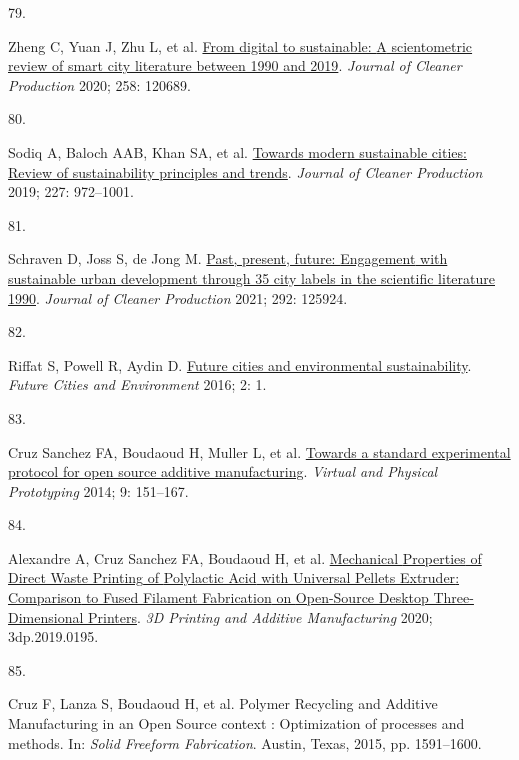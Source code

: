 \documentclass[
  12pt,
  a4paperpaper,
  onecolumn]{article}
\newlength{\cslhangindent}
\newlength{\csllabelwidth}
\newlength{\cslentryspacingunit} %
\newenvironment{CSLReferences}[2] %
 {%
  \setlength{\parindent}{0pt}
  \ifodd #1
  \let\oldpar\par
  \def\par{\hangindent=\cslhangindent\oldpar}
  \fi
  \setlength{\parskip}{#2\cslentryspacingunit}
 }%
 {}
\newcommand{\CSLLeftMargin}[1]{\parbox[t]{\csllabelwidth}{#1}}
\newcommand{\CSLRightInline}[1]{\parbox[t]{\linewidth - \csllabelwidth}{#1}\break}
\begin{document}
\begin{CSLReferences}{0}{0}
\leavevmode{}%
\CSLLeftMargin{79. }%
\CSLRightInline{Zheng C, Yuan J, Zhu L, et al.
\href{https://doi.org/10.1016/j.jclepro.2020.120689}{From digital to
sustainable: {A} scientometric review of smart city literature between
1990 and 2019}. \emph{Journal of Cleaner Production} 2020; 258: 120689.}

\leavevmode{}%
\CSLLeftMargin{80. }%
\CSLRightInline{Sodiq A, Baloch AAB, Khan SA, et al.
\href{https://doi.org/10.1016/j.jclepro.2019.04.106}{Towards modern
sustainable cities: {Review} of sustainability principles and trends}.
\emph{Journal of Cleaner Production} 2019; 227: 972--1001.}

\leavevmode{}%
\CSLLeftMargin{81. }%
\CSLRightInline{Schraven D, Joss S, de Jong M.
\href{https://doi.org/10.1016/j.jclepro.2021.125924}{Past, present,
future: {Engagement} with sustainable urban development through 35 city
labels in the scientific literature 1990\textendash 2019}. \emph{Journal
of Cleaner Production} 2021; 292: 125924.}

\leavevmode{}%
\CSLLeftMargin{82. }%
\CSLRightInline{Riffat S, Powell R, Aydin D.
\href{https://doi.org/10.1186/s40984-016-0014-2}{Future cities and
environmental sustainability}. \emph{Future Cities and Environment}
2016; 2: 1.}

\leavevmode{}%
\CSLLeftMargin{83. }%
\CSLRightInline{Cruz Sanchez FA, Boudaoud H, Muller L, et al.
\href{https://doi.org/10.1080/17452759.2014.919553}{Towards a standard
experimental protocol for open source additive manufacturing}.
\emph{Virtual and Physical Prototyping} 2014; 9: 151--167.}

\leavevmode{}%
\CSLLeftMargin{84. }%
\CSLRightInline{Alexandre A, Cruz Sanchez FA, Boudaoud H, et al.
\href{https://doi.org/10.1089/3dp.2019.0195}{Mechanical {Properties} of
{Direct Waste Printing} of {Polylactic Acid} with {Universal Pellets
Extruder}: {Comparison} to {Fused Filament Fabrication} on {Open-Source
Desktop Three-Dimensional Printers}}. \emph{3D Printing and Additive
Manufacturing} 2020; 3dp.2019.0195.}

\leavevmode{}%
\CSLLeftMargin{85. }%
\CSLRightInline{Cruz F, Lanza S, Boudaoud H, et al. Polymer {Recycling}
and {Additive Manufacturing} in an {Open Source} context :
{Optimization} of processes and methods. In: \emph{Solid {Freeform
Fabrication}}. {Austin, Texas}, 2015, pp. 1591--1600.}


\end{CSLReferences}
\end{document}
